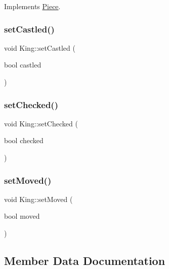 Implements \hyperlink{class_piece_a8891924c280568529878549f59541925}{Piece}.

\mbox{\label{class_king_a144a81bb4358863415ff41ff851fdbd4}} 
\subsubsection{\texorpdfstring{set\+Castled()}{setCastled()}}
{\footnotesize\ttfamily void King\+::set\+Castled (\begin{DoxyParamCaption}\item[{bool}]{castled }\end{DoxyParamCaption})}

\mbox{\label{class_king_af55ffa8c550debf65d6b64a91472626b}} 
\subsubsection{\texorpdfstring{set\+Checked()}{setChecked()}}
{\footnotesize\ttfamily void King\+::set\+Checked (\begin{DoxyParamCaption}\item[{bool}]{checked }\end{DoxyParamCaption})}

\mbox{\label{class_king_a989b5fc467d9b3f16394e4acd3767108}} 
\subsubsection{\texorpdfstring{set\+Moved()}{setMoved()}}
{\footnotesize\ttfamily void King\+::set\+Moved (\begin{DoxyParamCaption}\item[{bool}]{moved }\end{DoxyParamCaption})}



\subsection{Member Data Documentation}
\mbox{\label{class_king_af1d6712d05b377b1989d7625e5aceb38}} 
